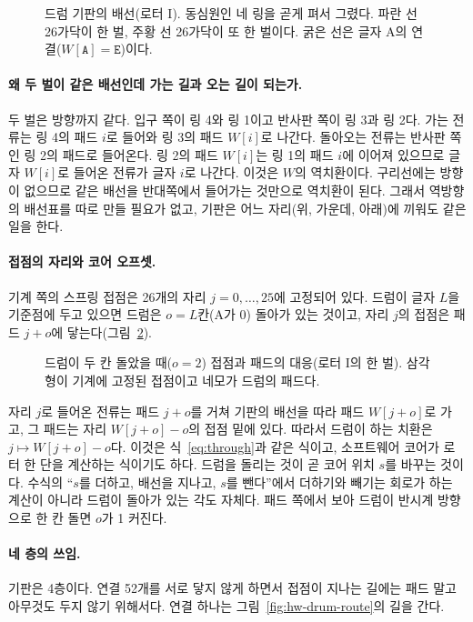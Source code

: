 \begin{figure}[ht]
\centering

\caption{드럼 기판의 배선(로터 I). 동심원인 네 링을 곧게 펴서 그렸다. 파란 선 26가닥이 한 벌, 주황 선
26가닥이 또 한 벌이다. 굵은 선은 글자 A의 연결($W[\mathtt{A}] = \mathtt{E}$)이다.}
\label{fig:hw-drum-wiring}
\end{figure}

\paragraph{왜 두 벌이 같은 배선인데 가는 길과 오는 길이 되는가.} 두 벌은 방향까지 같다. 입구 쪽이 링 4와
링 1이고 반사판 쪽이 링 3과 링 2다. 가는 전류는 링 4의 패드 $i$로 들어와 링 3의 패드 $W[i]$로 나간다.
돌아오는 전류는 반사판 쪽인 링 2의 패드로 들어온다. 링 2의 패드 $W[i]$는 링 1의 패드 $i$에 이어져 있으므로
글자 $W[i]$로 들어온 전류가 글자 $i$로 나간다. 이것은 $W$의 역치환이다. 구리선에는 방향이 없으므로 같은
배선을 반대쪽에서 들어가는 것만으로 역치환이 된다. 그래서 역방향의 배선표를 따로 만들 필요가 없고, 기판은
어느 자리(위, 가운데, 아래)에 끼워도 같은 일을 한다.

\paragraph{접점의 자리와 코어 오프셋.} 기계 쪽의 스프링 접점은 26개의 자리 $j = 0, \ldots, 25$에 고정되어
있다. 드럼이 글자 $L$을 기준점에 두고 있으면 드럼은 $o = L$칸(A가 0) 돌아가 있는 것이고, 자리 $j$의 접점은
패드 $j + o$에 닿는다(그림~\ref{fig:hw-drum-offset}).

\begin{figure}[ht]
\centering

\caption{드럼이 두 칸 돌았을 때($o = 2$) 접점과 패드의 대응(로터 I의 한 벌). 삼각형이 기계에 고정된 접점이고
네모가 드럼의 패드다.}
\label{fig:hw-drum-offset}
\end{figure}

자리 $j$로 들어온 전류는 패드 $j+o$를 거쳐 기판의 배선을 따라 패드 $W[j+o]$로 가고, 그 패드는 자리
$W[j+o] - o$의 접점 밑에 있다. 따라서 드럼이 하는 치환은 $j \mapsto W[j+o] - o$다. 이것은
식~\eqref{eq:through}과 같은 식이고, 소프트웨어 코어가 로터 한 단을 계산하는 식이기도 하다. 드럼을 돌리는
것이 곧 코어 위치 $s$를 바꾸는 것이다. 수식의 ``$s$를 더하고, 배선을 지나고, $s$를 뺀다''에서 더하기와
빼기는 회로가 하는 계산이 아니라 드럼이 돌아가 있는 각도 자체다. 패드 쪽에서 보아 드럼이 반시계 방향으로
한 칸 돌면 $o$가 1 커진다.

\paragraph{네 층의 쓰임.} 기판은 4층이다. 연결 52개를 서로 닿지 않게 하면서 접점이 지나는 길에는 패드
말고 아무것도 두지 않기 위해서다. 연결 하나는 그림~\ref{fig:hw-drum-route}의 길을 간다.

